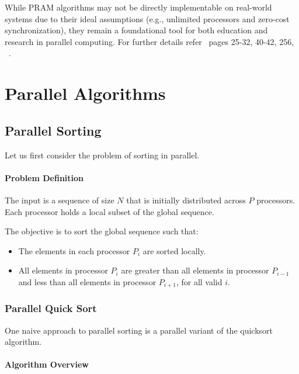 \documentclass[12pt]{book}
\begin{document}
While PRAM algorithms may not be directly implementable on real-world systems due to their ideal assumptions (e.g., unlimited processors and zero-cost synchronization), they remain a foundational tool for both education and research in parallel computing. For further details refer~\cite{quinn1994parallel} pages 25-32, 40-42, 256, ~\cite{pacheco2011introduction}.


\chapter{Parallel Algorithms}
\section{Parallel Sorting}
Let us first consider the problem of sorting in parallel.

\subsubsection*{Problem Definition}

The input is a sequence of size $N$ that is initially distributed across $P$ processors. Each processor holds a local subset of the global sequence.

The objective is to sort the global sequence such that:
\begin{itemize}
    \item The elements in each processor $P_i$ are sorted locally.
    \item All elements in processor $P_i$ are greater than all elements in processor $P_{i-1}$ and less than all elements in processor $P_{i+1}$, for all valid $i$.
\end{itemize}

\subsection{Parallel Quick Sort}

One naive approach to parallel sorting is a parallel variant of the quicksort algorithm.

\subsubsection*{Algorithm Overview}
\end{document}
